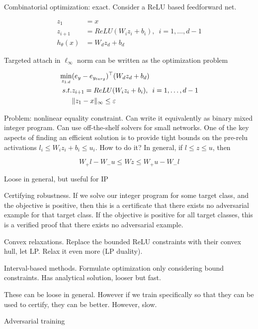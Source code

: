 \documentclass[english]{article}
\begin{document}
\item Combinatorial optimization: exact. Consider a ReLU based feedforward net. 

\begin{align*}
z_1&=x\\
z_{i+1} &= ReLU(W_iz_i+b_i),\,\,\,i=1,\ldots,d-1\\
h_\theta(x)&=W_dz_d+b_d
\end{align*}

Targeted attach in $\ell_\infty$ norm can be written as the optimization problem

\begin{align*}
\min_{z_{1:d}}& (e_y-e_{y_{targ}})^\top (W_d z_d + b_d)\\
s.t.& z_{i+1}= ReLU(W_iz_i+b_i),\,\,\,i=1,\ldots,d-1\\
&\|z_1-x\|_\infty\le \varepsilon
\end{align*}

Problem: nonlinear equality constraint. Can write it equivalently as binary mixed integer program. Can use off-the-shelf solvers for small networks. One of the key aspects of finding an efficient solution is to provide tight bounds on the pre-relu activations $l_i \le W_iz_i+b_i \le u_i$. How to do it?  In general, if $l\le z\le u$, then 

$$W_+l-W_-u\le Wz \le W_+u-W_-l$$

Loose in general, but useful for IP

\item Certifying robustness. If we solve our integer program for some target class, and the objective is positive, then this is a certificate that there exists no adversarial example for that target class. If the objective is positive for all target classes, this is a verified proof that there exists no adversarial example.

\item Convex relaxations. Replace the bounded ReLU constraints with their convex hull, let LP. Relax it even more (LP duality).

Interval-based methods. Formulate optimization only considering bound constraints. Has analytical solution, looser but fast.

These can be loose in general. However if we train specifically so that they can be used to certify, they can be better. However, slow.

\eenum 

\item Adversarial training
\benum 
\end{document}
